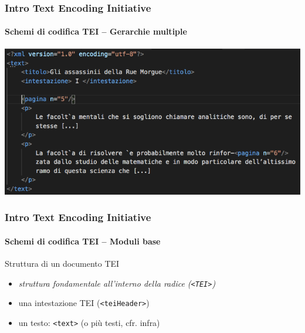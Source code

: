 \begin{frame}
	\frametitle{Intro Text Encoding Initiative}
	\framesubtitle{Schemi di codifica TEI – Gerarchie multiple}
	\addtocounter{nframe}{1}

	\begin{center}
		\includegraphics[width=.95\textwidth]{imgs/overlap-b.png}

       
    \end{center}
    
   

\end{frame}

\begin{frame}
	\frametitle{Intro Text Encoding Initiative}
	\framesubtitle{Schemi di codifica TEI – Moduli base}
	\addtocounter{nframe}{1}

	\begin{block}{Struttura di un documento TEI}
        \begin{itemize}
            \item \textit{struttura fondamentale all’interno della radice (\texttt{<TEI>})}
            \item una intestazione TEI (\texttt{<teiHeader>})
            \item un testo: \texttt{<text>} (o più testi, cfr. infra)
        \end{itemize}
    \end{block}
    
\end{frame}


